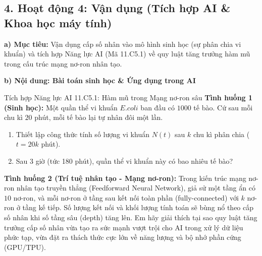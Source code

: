 \documentclass[12pt, a4paper]{article}
\begin{document}
\subsection*{4. Hoạt động 4: Vận dụng (Tích hợp AI \& Khoa học máy tính)}

\noindent \textbf{a) Mục tiêu:}
Vận dụng cấp số nhân vào mô hình sinh học (sự phân chia vi khuẩn) và tích hợp Năng lực AI (Mã 11.C5.1) về quy luật tăng trưởng hàm mũ trong cấu trúc mạng nơ-ron nhân tạo.

\noindent \textbf{b) Nội dung: Bài toán sinh học \& Ứng dụng trong AI}
\begin{aibox}{Tích hợp Năng lực AI 11.C5.1: Hàm mũ trong Mạng nơ-ron sâu}
\textbf{Tình huống 1 (Sinh học):} Một quần thể vi khuẩn $E. coli$ ban đầu có $1000$ tế bào. Cứ sau mỗi chu kì $20$ phút, mỗi tế bào lại tự nhân đôi một lần.
\begin{enumerate}[leftmargin=0.6cm]
    \item Thiết lập công thức tính số lượng vi khuẩn $N(t)$ sau $k$ chu kì phân chia ($t = 20k$ phút).
    \item Sau $3$ giờ (tức 180 phút), quần thể vi khuẩn này có bao nhiêu tế bào?
\end{enumerate}
\textbf{Tình huống 2 (Trí tuệ nhân tạo - Mạng nơ-ron):} Trong kiến trúc mạng nơ-ron nhân tạo truyền thẳng (Feedforward Neural Network), giả sử một tầng ẩn có $10$ nơ-ron, và mỗi nơ-ron ở tầng sau kết nối toàn phần (fully-connected) với $k$ nơ-ron ở tầng kế tiếp. Số lượng kết nối và khối lượng tính toán sẽ bùng nổ theo cấp số nhân khi số tầng sâu (depth) tăng lên. Em hãy giải thích tại sao quy luật tăng trưởng cấp số nhân vừa tạo ra sức mạnh vượt trội cho AI trong xử lý dữ liệu phức tạp, vừa đặt ra thách thức cực lớn về năng lượng và bộ nhớ phần cứng (GPU/TPU).
\end{aibox}
\end{document}
